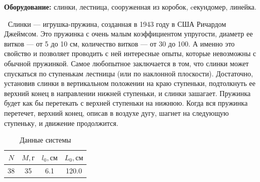 \documentclass[a4paper, 12pt]{article}
\begin{document}
\bigskip

\noindent \textbf{Оборудование:} слинки, лестница, сооруженная из коробок, cекундомер, линейка.
\bigskip



$\>$ Слинки — игрушка-пружина, созданная в 1943 году в США Ричардом Джеймсом. 
Это пружинка с очень малым коэффициентом упругости, диаметр ее витков — от 5 до 10 см, количество витков — от 30 до 100.
А именно это свойство и позволяет проводить с ней интересные опыты, которые невозможны с обычной пружинкой. Самое любопытное заключается в том, что слинки может спускаться по ступенькам лестницы (или по наклонной плоскости). Достаточно, установив слинки в вертикальном положении на краю ступеньки, подтолкнуть ее верхний конец в направлении нижней ступеньки, и слинки зашагает. Пружинка будет как бы перетекать с верхней ступеньки на нижнюю. Когда вся пружинка перетечет, верхний конец, описав в воздухе дугу, шагнет на следующую ступеньку, и движение продолжится. 



\begin{table}[h]
    \begin{center}
    \begin{tabular}{|c|c|c|c|}
        \hline \hline
        $ N $ & $ M, \text{г} $ & $ l_{0}, \text{см} $ & $ L_{0}, \text{см}$ \\
        \hline
        38 & 35 & 6.1 & 120.0 \\
        \hline \hline
    \end{tabular}
    \caption{Данные системы}
    \end{center}
\end{table}
\end{document}
